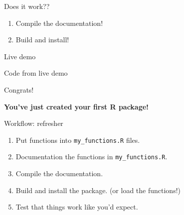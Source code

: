 \documentclass[12pt,ignorenonframetext,compress]{beamer}
\newenvironment{Shaded}{\begin{snugshade}}{\end{snugshade}}
\newcommand{\KeywordTok}[1]{\textcolor[rgb]{0.13,0.29,0.53}{\textbf{#1}}}
\newcommand{\DataTypeTok}[1]{\textcolor[rgb]{0.13,0.29,0.53}{#1}}
\newcommand{\StringTok}[1]{\textcolor[rgb]{0.31,0.60,0.02}{#1}}
\newcommand{\OperatorTok}[1]{\textcolor[rgb]{0.81,0.36,0.00}{\textbf{#1}}}
\newcommand{\NormalTok}[1]{#1}
\providecommand{\tightlist}{%
  \setlength{\itemsep}{0pt}\setlength{\parskip}{0pt}}
\begin{document}
\begin{frame}{Does it work??}

\begin{enumerate}
\def\labelenumi{\arabic{enumi}.}
\tightlist
\item
  Compile the documentation!
\item
  Build and install!
\end{enumerate}

Live demo

\end{frame}

\begin{frame}[fragile]{Code from live demo}

\begin{Shaded}
\end{Shaded}

\end{frame}

\begin{frame}{Congrats!}

\textbf{You've just created your first R package!}

\end{frame}

\begin{frame}[fragile]{Workflow: refresher}

\begin{enumerate}
\def\labelenumi{\arabic{enumi}.}
\tightlist
\item
  Put functions into \texttt{my\_functions.R} files.
\item
  Documentation the functions in \texttt{my\_functions.R}.
\item
  Compile the documentation.
\item
  Build and install the package. (or load the functions!)
\item
  Test that things work like you'd expect.
\end{enumerate}

\end{frame}
\end{document}
